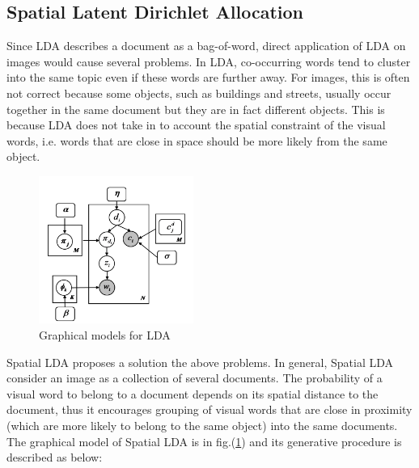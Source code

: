 \documentclass{acm_proc_article-sp}
\begin{document}
\subsection{Spatial Latent Dirichlet Allocation}\label{sec:slda}
Since LDA describes a document as a bag-of-word, direct application of LDA on images would cause several problems. In LDA, co-occurring words tend to cluster into the same topic even if these words are further away. For images, this is often 	not correct because some objects, such as buildings and streets, usually occur together in the same document but they are in fact different objects. This is because LDA does not take in to account the spatial constraint of the visual words, i.e. words that are close in space should be more likely from the same object.
\begin{figure}[!htb]
 \centering
 \includegraphics[width=0.45\textwidth]{fig/eqn/slda-variational}
 \caption{Graphical models for LDA}\label{fig:sldagraphical}
\end{figure}

Spatial LDA proposes a solution the above problems. In general, Spatial LDA consider an image as a collection of several documents. The probability of a visual word to belong to a document depends on its spatial distance to the document, thus it encourages grouping of visual words that are close in proximity (which are more likely to belong to the same object) into the same documents. The graphical model of Spatial LDA is in fig.(\ref{fig:sldagraphical}) and its generative procedure is described as below:
\end{document}
